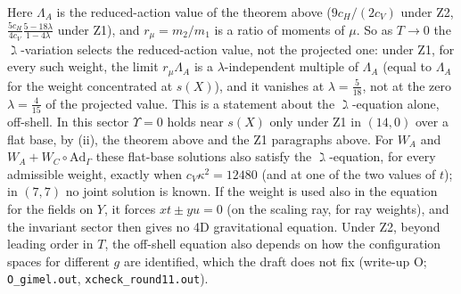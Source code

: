 \documentclass[11pt]{article}
\theoremstyle{remark}
\begin{document}
Here $\Lambda_A$ is the reduced-action value of the theorem above ($9c_H/(2c_V)$ under Z2, $\tfrac{5c_H}{4c_V}\tfrac{5-18\lambda}{1-4\lambda}$ under Z1), and $r_\mu=m_2/m_1$ is a ratio of moments of $\mu$. So as $T\to0$ the $\gimel$-variation selects the reduced-action value, not the projected one: under Z1, for every such weight, the limit $r_\mu\Lambda_A$ is a $\lambda$-independent multiple of $\Lambda_A$ (equal to $\Lambda_A$ for the weight concentrated at $s(X)$), and it vanishes at $\lambda=\tfrac5{18}$, not at the zero $\lambda=\tfrac4{15}$ of the projected value. This is a statement about the $\gimel$-equation alone, off-shell. In this sector $\Upsilon=0$ holds near $s(X)$ only under Z1 in $(14,0)$ over a flat base, by (ii), the theorem above and the Z1 paragraphs above. For $W_A$ and $W_A+W_C\circ\mathrm{Ad}_\Gamma$ these flat-base solutions also satisfy the $\gimel$-equation, for every admissible weight, exactly when $c_V\kappa^2=12480$ (and at one of the two values of $t$); in $(7,7)$ no joint solution is known. If the weight is used also in the equation for the fields on $Y$, it forces $xt\pm yu=0$ (on the scaling ray, for ray weights), and the invariant sector then gives no 4D gravitational equation. Under Z2, beyond leading order in $T$, the off-shell equation also depends on how the configuration spaces for different $g$ are identified, which the draft does not fix (write-up O; \texttt{O\_gimel.out}, \texttt{xcheck\_round11.out}).
\end{document}

